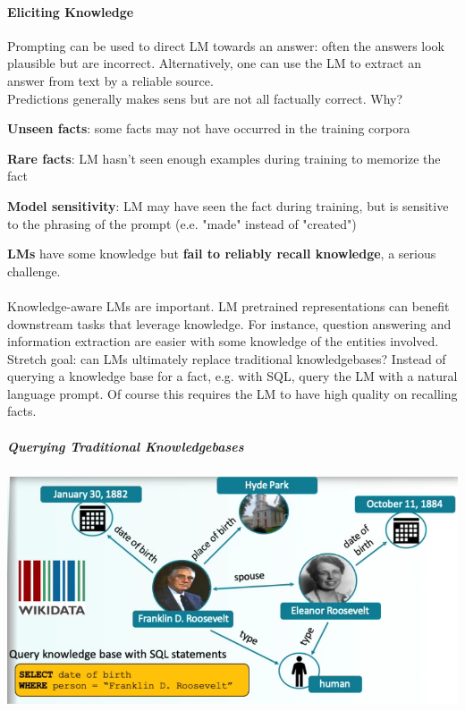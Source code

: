 \documentclass[10pt]{report}
\begin{document}
\paragraph{Eliciting Knowledge} Prompting can be used to direct LM towards an answer: often the answers look plausible but are incorrect. Alternatively, one can use the LM to extract an answer from text by a reliable source.\\
Predictions generally makes sens but are not all factually correct. Why?\begin{list}{}{}
	\item \textbf{Unseen facts}: some facts may not have occurred in the training corpora
	\item \textbf{Rare facts}: LM hasn't seen enough examples during training to memorize the fact
	\item \textbf{Model sensitivity}: LM may have seen the fact during training, but is sensitive to the phrasing of the prompt (e.e. "made" instead of "created")
\end{list}
\textbf{LMs} have some knowledge but \textbf{fail to reliably recall knowledge}, a serious challenge.\\\\
Knowledge-aware LMs are important. LM pretrained representations can benefit downstream tasks that leverage knowledge. For instance, question answering and information extraction are easier with some knowledge of the entities involved. Stretch goal: can LMs ultimately replace traditional knowledgebases? Instead of querying a knowledge base for a fact, e.g. with SQL, query the LM with a natural language prompt. Of course this requires the LM to have high quality on recalling facts.
\subparagraph{Querying Traditional Knowledgebases}
\begin{center}
	\includegraphics[scale=0.33]{104.png}
\end{center}
\end{document}
